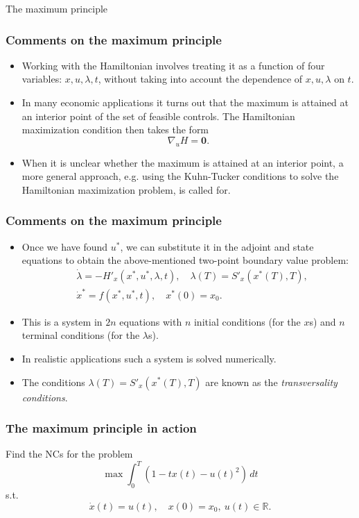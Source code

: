 \documentclass[10pt]{beamer}
\theoremstyle{definition}
\begin{document}
\begin{section}{The maximum principle}
\begin{frame}[fragile]
\frametitle{Comments on the maximum principle}
\begin{itemize}\itemsep1em
\item Working with the Hamiltonian involves treating it as a function of four variables: $ x,u,\lambda,t $, without taking into account the dependence of $ x,u,\lambda $ on $ t $.
\item In many economic applications it turns out that the maximum is attained at an interior point of the set of feasible controls. The Hamiltonian maximization condition then takes the form \[ \nabla_u H = \mathbf{0}. \]
\item When it is unclear whether the maximum is attained at an interior point, a more general approach, e.g. using the Kuhn-Tucker conditions to solve the Hamiltonian maximization problem, is called for.
\end{itemize}
\end{frame}

\begin{frame}[fragile]
\frametitle{Comments on the maximum principle}
\begin{itemize}\itemsep1em
\item Once we have found $ u^* $, we can substitute it in the adjoint and state equations to obtain the above-mentioned two-point boundary value problem:
\[ \begin{split}
&\dot{\lambda}  = -H'_x(x^*,u^*,\lambda,t),\quad  \lambda(T)=S'_x(x^*(T),T),\\
&\dot{x}^*  = f(x^*,u^*,t), \quad x^*(0)=x_0.
\end{split} \]
\item This is a system in $ 2n $ equations with $ n $ initial conditions (for the $ x $s)  and $ n $ terminal conditions (for the $ \lambda $s).
\item In realistic applications such a system is solved numerically.
\item The conditions $ \lambda(T)=S'_x(x^*(T),T) $ are known as the \emph{transversality conditions}.
\end{itemize}
\end{frame}

\begin{frame}[fragile]
\frametitle{The maximum principle in action}
\begin{example}
Find the NCs for the problem
\[ \max \int_{0}^{T}(1-tx(t)-u(t)^2)\,dt \]
s.t. \[ \dot{x}(t)=u(t),\quad x(0)=x_0,~u(t)\in \mathbb{R}. \]\bigskip \pause


\end{example}
\end{frame}
\end{section}
\end{document}
